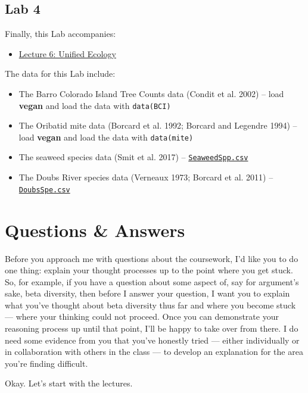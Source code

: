 \documentclass[
  10pt,
]{book}
\providecommand{\tightlist}{%
  \setlength{\itemsep}{0pt}\setlength{\parskip}{0pt}}
\let\oldtexttt\texttt
\renewcommand{\texttt}[1]{\oldtexttt{\small #1}}
\begin{document}
\subsection{Lab 4}\label{lab-4}

Finally, this Lab accompanies:

\begin{itemize}
\tightlist
\item
  \href{Lec-06-unified-ecology.html}{Lecture 6: Unified Ecology}
\end{itemize}

The data for this Lab include:

\begin{itemize}
\tightlist
\item
  The Barro Colorado Island Tree Counts data (Condit et al. 2002) --
  load \textbf{vegan} and load the data with \texttt{data(BCI)}
\item
  The Oribatid mite data (Borcard et al. 1992; Borcard and Legendre
  1994) -- load \textbf{vegan} and load the data with
  \texttt{data(mite)}
\item
  The seaweed species data (Smit et al. 2017) --
  \href{../data/seaweed/SeaweedSpp.csv}{\texttt{SeaweedSpp.csv}}
\item
  The Doubs River species data (Verneaux 1973; Borcard et al. 2011) --
  \href{../data/DoubsSpe.csv}{\texttt{DoubsSpe.csv}}
\end{itemize}

\section{Questions \& Answers}\label{questions-answers}

Before you approach me with questions about the coursework, I'd like you
to do one thing: explain your thought processes up to the point where
you get stuck. So, for example, if you have a question about some aspect
of, say for argument's sake, beta diversity, then before I answer your
question, I want you to explain what you've thought about beta diversity
thus far and where you become stuck --- where your thinking could not
proceed. Once you can demonstrate your reasoning process up until that
point, I'll be happy to take over from there. I do need some evidence
from you that you've honestly tried --- either individually or in
collaboration with others in the class --- to develop an explanation for
the area you're finding difficult.

Okay. Let's start with the lectures.
\end{document}
